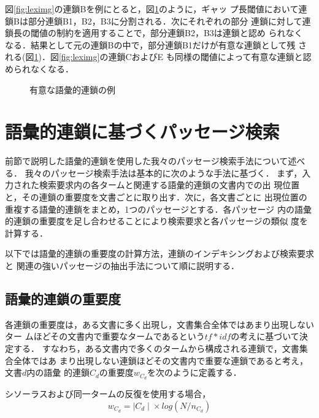 図\ref{fig:leximg}の連鎖Bを例にとると，図\ref{fig:decidechn}のように，ギャッ
プ長閾値において連鎖Bは部分連鎖B1，B2，B3に分割される．次にそれぞれの部分
連鎖に対して連鎖長の閾値の制約を適用することで，部分連鎖B2，B3は連鎖と認め
られなく
なる．結果として元の連鎖Bの中で，部分連鎖B1だけが有意な連鎖として残
される(図\ref{fig:decidechn})．図\ref{fig:leximg}の連鎖CおよびE
も同様の閾値によって有意な連鎖と認められなくなる．

\begin{figure}[htbp]
\begin{center}
\caption{有意な語彙的連鎖の例}
\label{fig:decidechn}
\end{center}
\end{figure}

\section{語彙的連鎖に基づくパッセージ検索}\label{sec:ourpassage}
前節で説明した語彙的連鎖を使用した我々のパッセージ検索手法について述べる．
我々のパッセージ検索手法は基本的に次のような手法に基づく．
まず，入力された検索要求内の各タームと関連する語彙的連鎖の文書内での出
現位置と，その連鎖の重要度を文書ごとに取り出す．次に，各文書ごとに
出現位置の重複する語彙的連鎖をまとめ，1つのパッセージとする．各パッセージ
内の語彙的連鎖の重要度を足し合わせることにより検索要求と各パッセージの類似
度を計算する．

以下では語彙的連鎖の重要度の計算方法，連鎖のインデキシングおよび検索要求と
関連の強いパッセージの抽出手法について順に説明する．

\subsection{語彙的連鎖の重要度}\label{ssec:lexweighting}

各連鎖の重要度は，ある文書に多く出現し，文書集合全体ではあまり出現しないター
ムほどその文書内で重要なタームであるという$tf*idf$の考えに基づいて決
定する．
すなわち，ある文書内で多くのタームから構成される連鎖で，文書集合全体ではあ
まり出現しない連鎖ほどその文書内で重要な連鎖であると考え，文書$d$内の語彙
的連鎖$C_{d}$の重要度$w_{C_d}$を次のように定義する．

シソーラスおよび同一タームの反復を使用する場合，
\begin{equation}\label{equ:cweight_lex}
w_{C_d} = {\mid C_{d}\mid}\times log(N/n_{C_{d}})
\end{equation}

